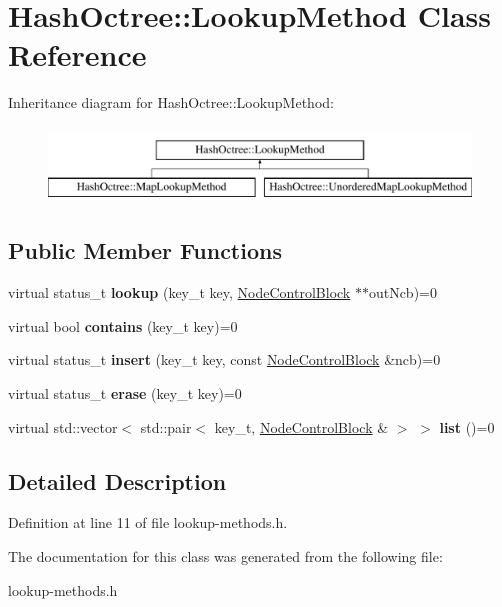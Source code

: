 \hypertarget{class_hash_octree_1_1_lookup_method}{}\section{Hash\+Octree\+::Lookup\+Method Class Reference}
\label{class_hash_octree_1_1_lookup_method}
Inheritance diagram for Hash\+Octree\+::Lookup\+Method\+:\begin{figure}[H]
\begin{center}
\leavevmode
\includegraphics[height=2.000000cm]{class_hash_octree_1_1_lookup_method}
\end{center}
\end{figure}
\subsection*{Public Member Functions}
\begin{DoxyCompactItemize}
\item 
\mbox{\label{class_hash_octree_1_1_lookup_method_a4e35b85a9b630e022c17d5b0d2da71da}} 
virtual status\+\_\+t {\bfseries lookup} (key\+\_\+t key, \mbox{\hyperlink{class_hash_octree_1_1_node_control_block}{Node\+Control\+Block}} $\ast$$\ast$out\+Ncb)=0
\item 
\mbox{\label{class_hash_octree_1_1_lookup_method_adcf3e2deab4804f5141361895a0ccf0a}} 
virtual bool {\bfseries contains} (key\+\_\+t key)=0
\item 
\mbox{\label{class_hash_octree_1_1_lookup_method_aab36c1980bd62471302d56a8eb41fdeb}} 
virtual status\+\_\+t {\bfseries insert} (key\+\_\+t key, const \mbox{\hyperlink{class_hash_octree_1_1_node_control_block}{Node\+Control\+Block}} \&ncb)=0
\item 
\mbox{\label{class_hash_octree_1_1_lookup_method_a6486fff0a39aa0c2a19a2cb19bd4aa94}} 
virtual status\+\_\+t {\bfseries erase} (key\+\_\+t key)=0
\item 
\mbox{\label{class_hash_octree_1_1_lookup_method_aa0afc2536256ef56a317162a16c361b1}} 
virtual std\+::vector$<$ std\+::pair$<$ key\+\_\+t, \mbox{\hyperlink{class_hash_octree_1_1_node_control_block}{Node\+Control\+Block}} \& $>$ $>$ {\bfseries list} ()=0
\end{DoxyCompactItemize}


\subsection{Detailed Description}


Definition at line 11 of file lookup-\/methods.\+h.



The documentation for this class was generated from the following file\+:\begin{DoxyCompactItemize}
\item 
lookup-\/methods.\+h\end{DoxyCompactItemize}
